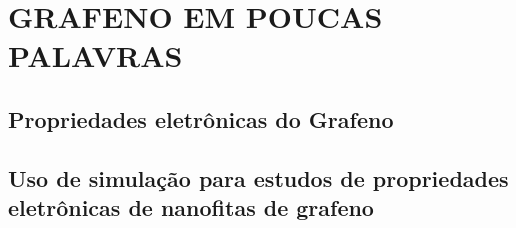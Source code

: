 \chapter{GRAFENO EM POUCAS PALAVRAS}
\section{Propriedades eletrônicas do Grafeno}

\section{Uso de simulação para estudos de propriedades eletrônicas de nanofitas de grafeno}